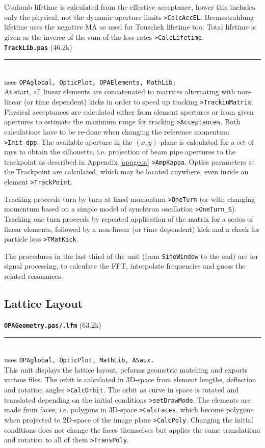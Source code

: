 \documentclass[12pt]{article}
\newcommand\code[1]{{\tt #1}}
\newcommand\opamodule[3]{{\bf \tt #1} #2\\  \rule[3pt]{\textwidth}{0.2pt} \\ {\scriptsize uses \tt  #3}\\[1ex]}
\begin{document}
Coulomb lifetime is calculated from the effective acceptance, hower this includes only the physical, not the dynamic aperture limits \code{>CalcAccEL}. Bremsstrahlung lifetime uses the negative MA as used for Touschek lifetime too. Total lifetime is given as the inverse of the sum of the loss rates \code{>CalcLifetime}.\\

\opamodule{TrackLib.pas}{(46.2k)}{OPAglobal, OpticPlot, OPAElements, MathLib;}
At start, all linear elements are concatenated to matrices alternating with non-linear (or time dependent) kicks in order to speed up tracking \code{>TrackinMatrix}. Physical acceptances are calculated either from element apertures or from given apertures to estimate the maximum range for tracking \code{>Acceptances}. Both calculations have to be re-done when changing the reference momentum \code{>Init\_dpp}.
The available aperture in the $(x,y)$-plane is calculated for a set of rays to obtain the silhouette, i.e. projection of beam pipe apertures to the trackpoint as described in Appendix \ref{appgeoa} \code{>AmpKappa}. Optics parameters at the Trackpoint are calculated, which may be located anywhere, even inside an element \code{>TrackPoint}.

Tracking proceeds turn by turn at fixed momentum \code{>OneTurn} (or with changing momentum based on a simple model of synchtron oscillation \code{>OneTurn\_S}). Tracking one turn proceeds by repeated application of the matrix for a series of linear elements, followed by a non-linear (or time dependent) kick and a check for particle loss \code{>TMatKick}.

The procedures in the last third of the unit (from {\tt SineWindow} to the end) are for signal processing, to calculate the FFT, interpolate frequencies and guess the related resonances.\\

\subsection{Lattice Layout}
\opamodule{OPAGeometry.pas/.lfm}{(63.2k)}{OPAglobal, OpticPlot, MathLib, ASaux.}
This unit displays the lattice layout, peforms geometric matching and exports various files.
The orbit is calculated in 3D-space from element lengths, deflection and rotation angles \code{>CalcOrbit}. The orbit as curve in space is rotated and translated depending on the initial conditions \code{>setDrawMode}.
The elements are made from faces, i.e. polygons in 3D-space \code{>CalcFaces}, which become polygons when projected to 2D-space of the image plane \code{>CalcPoly}. Changing the initial conditions does not change the faces themselves but applies the same translationa and rotation to all of them \code{>TransPoly}.
\end{document}
